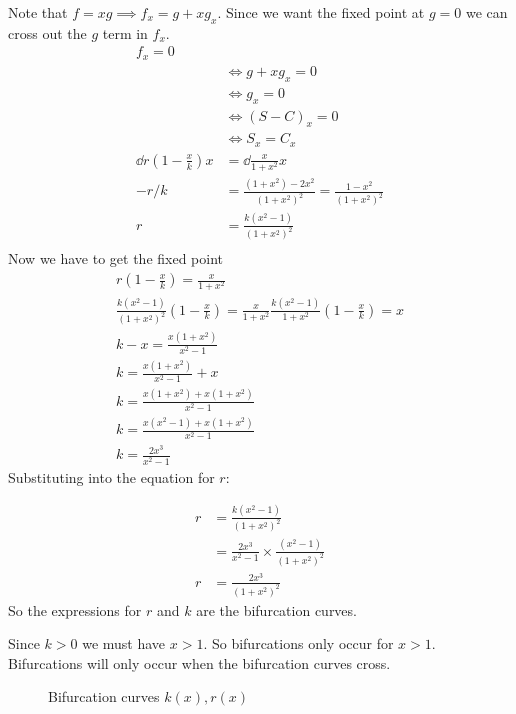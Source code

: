 \documentclass{X:/Documents/Coding/Latex/myassignment}
\begin{document}
Note that $f=xg \implies f_x = g+xg_x$. Since we want the fixed point at $g=0$ we can cross out the $g$ term in $f_x$.
\begin{align*}
    f_x = 0\\
    &\Leftrightarrow g + xg_x = 0\\
    &\Leftrightarrow g_x = 0\\
    &\Leftrightarrow (S-C)_x= 0\\
    &\Leftrightarrow S_x=C_x\\
    \dd{r\left(1-\frac xk\right) }x &= \dd{\frac{x}{1+x^2}}x\\
    -r/k &= \frac{(1+x^2) - 2x^2}{(1+x^2)^2} = \frac{1-x^2}{(1+x^2)^2}\\
    r &= \frac{k(x^2-1)}{(1+x^2)^2}\\
\end{align*}
Now we have to get the fixed point
\begin{align*}
    r(1-\frac xk) = \frac{x}{1+x^2}\\
    \frac{k(x^2-1)}{(1+x^2)^2} (1-\frac xk) = \frac{x}{1+x^2}
    \frac{k(x^2-1)}{1+x^2} (1-\frac xk) = x\\
     k-x = \frac{x(1+x^2)}{x^2-1}\\
     k = \frac{x(1+x^2)}{x^2-1} +x\\
     k = \frac{x(1+x^2) + x(1+x^2)}{x^2-1}\\
     k = \frac{x(x^2-1) + x(1+x^2)}{x^2-1}\\
     k = \frac{2x^3}{x^2-1}
\end{align*}
Substituting into the equation for $r$:

\begin{align*}
    r &= \frac{k(x^2-1)}{(1+x^2)^2}\\
    &=\frac{2x^3}{x^2-1}\times \frac{(x^2-1)}{(1+x^2)^2}\\
    r&=\frac{2x^3}{(1+x^2)^2}
\end{align*}
So the expressions for $r$ and $k$ are the bifurcation curves.

Since $k >0$ we must have $x > 1$. So bifurcations only occur for $x >1$.
Bifurcations will only occur when the bifurcation curves cross.


\begin{figure}[h]
\centering
{}
\caption{Bifurcation curves $k(x), r(x)$}
\end{figure}
\end{document}
